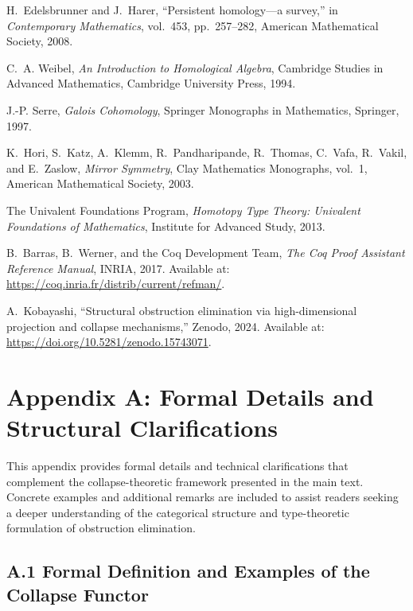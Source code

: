 \documentclass[11pt]{article}
\begin{document}
\begin{thebibliography}{99}

H.~Edelsbrunner and J.~Harer, ``Persistent homology—a survey,'' in \emph{Contemporary Mathematics}, vol.~453, pp.~257--282, American Mathematical Society, 2008.

C.~A. Weibel, \emph{An Introduction to Homological Algebra}, Cambridge Studies in Advanced Mathematics, Cambridge University Press, 1994.

J.-P. Serre, \emph{Galois Cohomology}, Springer Monographs in Mathematics, Springer, 1997.

K.~Hori, S.~Katz, A.~Klemm, R.~Pandharipande, R.~Thomas, C.~Vafa, R.~Vakil, and E.~Zaslow, \emph{Mirror Symmetry}, Clay Mathematics Monographs, vol.~1, American Mathematical Society, 2003.

The Univalent Foundations Program, \emph{Homotopy Type Theory: Univalent Foundations of Mathematics}, Institute for Advanced Study, 2013.

B.~Barras, B.~Werner, and the Coq Development Team, \emph{The Coq Proof Assistant Reference Manual}, INRIA, 2017. Available at: \url{https://coq.inria.fr/distrib/current/refman/}.

A.~Kobayashi, ``Structural obstruction elimination via high-dimensional projection and collapse mechanisms,'' Zenodo, 2024. Available at: \url{https://doi.org/10.5281/zenodo.15743071}.

\end{thebibliography}



\appendix

\section*{Appendix A: Formal Details and Structural Clarifications}

This appendix provides formal details and technical clarifications that complement the collapse-theoretic framework presented in the main text. Concrete examples and additional remarks are included to assist readers seeking a deeper understanding of the categorical structure and type-theoretic formulation of obstruction elimination.

\subsection*{A.1 Formal Definition and Examples of the Collapse Functor}
\end{document}
